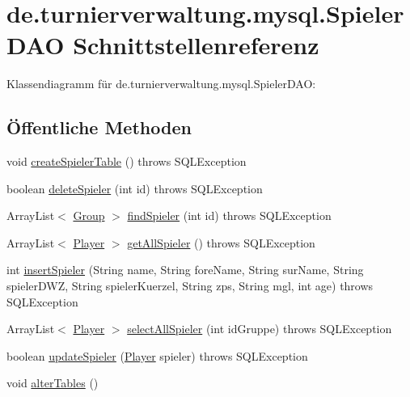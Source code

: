 \hypertarget{interfacede_1_1turnierverwaltung_1_1mysql_1_1_spieler_d_a_o}{}\section{de.\+turnierverwaltung.\+mysql.\+Spieler\+D\+AO Schnittstellenreferenz}
\label{interfacede_1_1turnierverwaltung_1_1mysql_1_1_spieler_d_a_o}


Klassendiagramm für de.\+turnierverwaltung.\+mysql.\+Spieler\+D\+AO\+:
\subsection*{Öffentliche Methoden}
\begin{DoxyCompactItemize}
\item 
void \hyperlink{interfacede_1_1turnierverwaltung_1_1mysql_1_1_spieler_d_a_o_aa62688ee5df00c7033b72764c5ddbb31}{create\+Spieler\+Table} ()  throws S\+Q\+L\+Exception
\item 
boolean \hyperlink{interfacede_1_1turnierverwaltung_1_1mysql_1_1_spieler_d_a_o_a325b7ccedde842c56a87070b2841db9e}{delete\+Spieler} (int id)  throws S\+Q\+L\+Exception
\item 
Array\+List$<$ \hyperlink{classde_1_1turnierverwaltung_1_1model_1_1_group}{Group} $>$ \hyperlink{interfacede_1_1turnierverwaltung_1_1mysql_1_1_spieler_d_a_o_a4e982266dcb9354597be0bace5c51a46}{find\+Spieler} (int id)  throws S\+Q\+L\+Exception
\item 
Array\+List$<$ \hyperlink{classde_1_1turnierverwaltung_1_1model_1_1_player}{Player} $>$ \hyperlink{interfacede_1_1turnierverwaltung_1_1mysql_1_1_spieler_d_a_o_af74b25ea2d0bc650cb2ab164c88e2484}{get\+All\+Spieler} ()  throws S\+Q\+L\+Exception
\item 
int \hyperlink{interfacede_1_1turnierverwaltung_1_1mysql_1_1_spieler_d_a_o_aa612b890303e16cd9b506093b074ac9d}{insert\+Spieler} (String name, String fore\+Name, String sur\+Name, String spieler\+D\+WZ, String spieler\+Kuerzel, String zps, String mgl, int age)  throws S\+Q\+L\+Exception
\item 
Array\+List$<$ \hyperlink{classde_1_1turnierverwaltung_1_1model_1_1_player}{Player} $>$ \hyperlink{interfacede_1_1turnierverwaltung_1_1mysql_1_1_spieler_d_a_o_abe5876609537ef75247c37f5c78f1da6}{select\+All\+Spieler} (int id\+Gruppe)  throws S\+Q\+L\+Exception
\item 
boolean \hyperlink{interfacede_1_1turnierverwaltung_1_1mysql_1_1_spieler_d_a_o_adf9099c3ccbf8f33acf20287afb067b4}{update\+Spieler} (\hyperlink{classde_1_1turnierverwaltung_1_1model_1_1_player}{Player} spieler)  throws S\+Q\+L\+Exception
\item 
void \hyperlink{interfacede_1_1turnierverwaltung_1_1mysql_1_1_spieler_d_a_o_aa36be07673e3f2e4c0b7598937fd3407}{alter\+Tables} ()
\end{DoxyCompactItemize}


